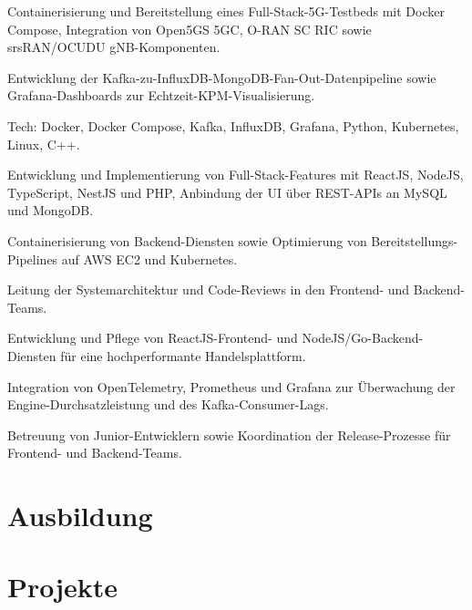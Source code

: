 \documentclass[10pt,a4paper]{resume}
\begin{document}
\bullets
  \item Containerisierung und Bereitstellung eines Full-Stack-5G-Testbeds mit Docker Compose, Integration von Open5GS 5GC, O-RAN SC RIC sowie srsRAN/OCUDU gNB-Komponenten.
  \item Entwicklung der Kafka-zu-InfluxDB-MongoDB-Fan-Out-Datenpipeline sowie Grafana-Dashboards zur Echtzeit-KPM-Visualisierung.
  \item Tech: Docker, Docker Compose, Kafka, InfluxDB, Grafana, Python, Kubernetes, Linux, C++.
\bulletsend
\vspace{1.5pt}
\bullets
  \item Entwicklung und Implementierung von Full-Stack-Features mit ReactJS, NodeJS, TypeScript, NestJS und PHP, Anbindung der UI über REST-APIs an MySQL und MongoDB.
  \item Containerisierung von Backend-Diensten sowie Optimierung von Bereitstellungs-Pipelines auf AWS EC2 und Kubernetes.
  \item Leitung der Systemarchitektur und Code-Reviews in den Frontend- und Backend-Teams.
\bulletsend
\vspace{1.5pt}
\bullets
  \item Entwicklung und Pflege von ReactJS-Frontend- und NodeJS/Go-Backend-Diensten für eine hochperformante Handelsplattform.
  \item Integration von OpenTelemetry, Prometheus und Grafana zur Überwachung der Engine-Durchsatzleistung und des Kafka-Consumer-Lags.
  \item Betreuung von Junior-Entwicklern sowie Koordination der Release-Prozesse für Frontend- und Backend-Teams.
\bulletsend
\vspace{1.5pt}

\section{Ausbildung}

\vspace{2pt}

\section{Projekte}
\end{document}
